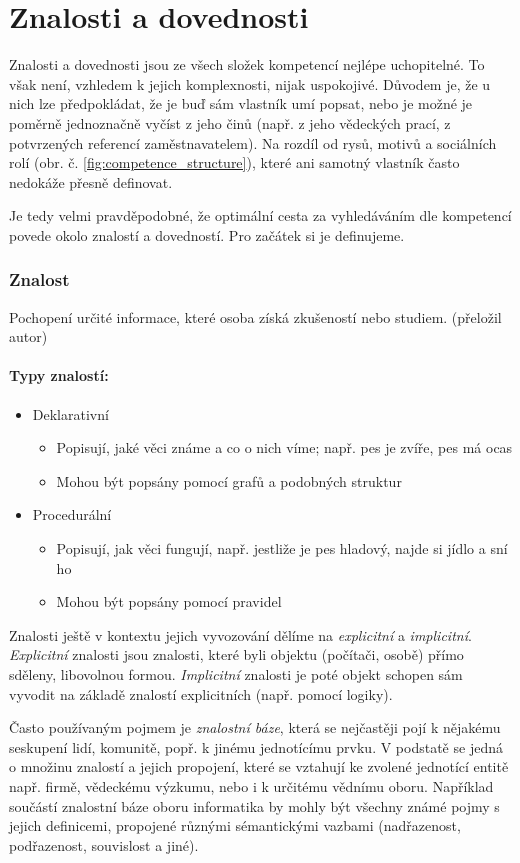 \section{Znalosti a dovednosti}
Znalosti a dovednosti jsou ze všech složek  kompetencí nejlépe uchopitelné. To však není, vzhledem k jejich komplexnosti, nijak uspokojivé. Důvodem je, že u nich lze předpokládat, že je buď sám vlastník umí popsat, nebo je možné je poměrně jednoznačně vyčíst z jeho činů (např. z jeho vědeckých prací, z potvrzených referencí zaměstnavatelem). Na rozdíl od rysů, motivů a sociálních rolí (obr. č. \ref{fig:competence_structure}), které ani samotný vlastník často nedokáže přesně definovat.\par
Je tedy velmi pravděpodobné, že optimální cesta za vyhledáváním dle kompetencí povede okolo znalostí a dovedností. Pro začátek si je definujeme.
\subsubsection*{Znalost}
 Pochopení určité informace, které osoba získá zkušeností nebo studiem. \cite{cite:01} (přeložil autor) \par
\paragraph{Typy znalostí:}
\begin{itemize}
\item Deklarativní
\begin{itemize}
\item Popisují, jaké věci známe a co o nich víme; např. pes je zvíře, pes má ocas
\item Mohou být popsány pomocí grafů a podobných struktur
\end{itemize}
\item Procedurální
\begin{itemize}
\item Popisují, jak věci fungují, např. jestliže je pes hladový, najde si jídlo a sní ho
\item Mohou být popsány pomocí pravidel \cite{cite:11}
\end{itemize}
\end{itemize}
Znalosti ještě v kontextu jejich vyvozování dělíme na \textit{explicitní} a \textit{implicitní}.  \textit{Explicitní} znalosti jsou znalosti, které byli objektu (počítači, osobě) přímo sděleny, libovolnou formou. \textit{Implicitní} znalosti je poté objekt schopen sám vyvodit na základě znalostí explicitních (např. pomocí logiky).\cite{Stephan2007}\par
Často používaným pojmem je \textit{znalostní báze}, která se nejčastěji pojí k nějakému seskupení lidí, komunitě, popř. k jinému jednotícímu prvku. V podstatě se jedná o množinu znalostí a jejich propojení, které se vztahují ke zvolené jednotící entitě např. firmě, vědeckému výzkumu, nebo i k určitému vědnímu oboru. Například součástí znalostní báze oboru informatika by mohly být všechny známé pojmy s jejich definicemi, propojené různými sémantickými vazbami (nadřazenost, podřazenost, souvislost a jiné).
